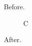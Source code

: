 \documentclass{article}
\begin{document}
Before.
\begin{figure}\listsubcaptions*\caption{C}\end{figure}
After.
\end{document}
